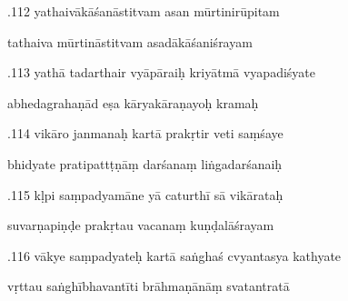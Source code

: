 \documentclass[article,12pt,a4paper]{memoir}%
\newcounter{parCount}
\begin{document}
	  
	  \pstart {}.112 yathaivākāśanāstitvam asan mūrtinirūpitam 
	{}
	\pend%
      

	  
	  \pstart \leavevmode%
	tathaiva mūrtināstitvam asadākāśaniśrayam 
	{}
	\pend%
      

	  
	  \pstart {}.113 yathā tadarthair vyāpāraiḥ kriyātmā vyapadiśyate 
	{}
	\pend%
      

	  
	  \pstart \leavevmode%
	abhedagrahaṇād eṣa kāryakāraṇayoḥ kramaḥ 
	{}
	\pend%
      

	  
	  \pstart {}.114 vikāro janmanaḥ kartā prakṛtir veti saṃśaye 
	{}
	\pend%
      

	  
	  \pstart \leavevmode%
	bhidyate pratipattṭṇāṃ darśanaṃ liṅgadarśanaiḥ 
	{}
	\pend%
      

	  
	  \pstart {}.115 kḷpi saṃpadyamāne yā caturthī sā vikārataḥ 
	{}
	\pend%
      

	  
	  \pstart \leavevmode%
	suvarṇapiṇḍe prakṛtau vacanaṃ kuṇḍalāśrayam 
	{}
	\pend%
      

	  
	  \pstart {}.116 vākye saṃpadyateḥ kartā saṅghaś cvyantasya kathyate 
	{}
	\pend%
      

	  
	  \pstart \leavevmode%
	vṛttau saṅghībhavantīti brāhmaṇānāṃ svatantratā 
	{}
	\pend%
      
\end{document}
